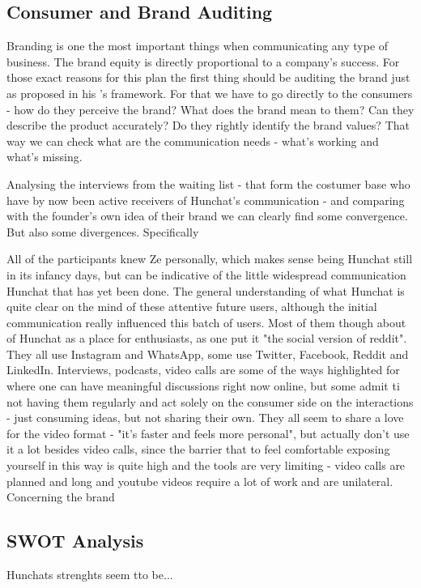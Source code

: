 \documentclass[12pt]{article}
\begin{document}
\subsection{Consumer and Brand Auditing}
Branding is one the most important things when communicating any type of business. The brand equity is directly proportional to a company's success. For those exact reasons for this plan the first thing should be auditing the brand just as \citeauthor{kliatchko} proposed in his \citeyear{kliatchko}'s framework. For that we have to go directly to the consumers - how do they perceive the brand? What does the brand mean to them? Can they describe the product accurately? Do they rightly identify the brand values? That way we can check what are the communication needs - what's working and what's missing.

Analysing the interviews from the waiting list - that form the costumer base who have by now been active receivers of Hunchat's communication - and comparing with the founder's own idea of their brand we can clearly find some convergence. %
But also some divergences. Specifically

All of the participants knew Ze personally, which makes sense being Hunchat still in its infancy days, but can be indicative of the little widespread communication Hunchat that has yet been done. The general understanding of what Hunchat is quite clear on the mind of these attentive future users, although the initial communication really influenced this batch of users. Most of them though about of Hunchat as a place for enthusiasts, as one put it "the social version of reddit". They all use Instagram and WhatsApp, some use Twitter, Facebook, Reddit and LinkedIn.  Interviews, podcasts, video calls are some of the ways highlighted for where one can have meaningful discussions right now online, but some admit ti not having them regularly and act solely on the consumer side on the interactions - just consuming ideas, but not sharing their own. They all seem to share a love for the video format - "it's faster and feels more personal", but actually don't use it a lot besides video calls, since the barrier that  to feel comfortable exposing yourself in this way is quite high and the tools are very limiting - video calls are planned and long and youtube videos require a lot of work and are unilateral. Concerning the brand 

\subsection{SWOT Analysis}
Hunchats strenghts seem tto be...
\end{document}
